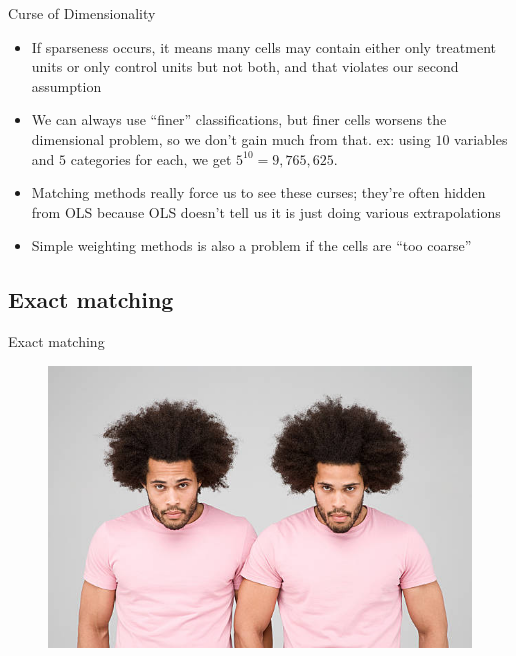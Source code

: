 \documentclass{beamer}
\begin{document}
\begin{frame}{Curse of Dimensionality}
	
	\begin{itemize}
	\item If sparseness occurs, it means many cells may contain either only treatment units or only control units but not both, and that violates our second assumption
	\item We can always use ``finer'' classifications, but finer cells worsens the dimensional problem, so we don't gain  much from that.  ex: using $10$ variables and $5$ categories for each, we get $5^{10} = 9,765,625$.  
	\item Matching methods really force us to see these curses; they're often hidden from OLS because OLS doesn't tell us it is just doing various extrapolations
	\item Simple weighting methods is also a problem if the cells are ``too coarse''
	\end{itemize}
\end{frame}	


\subsection{Exact matching}

\begin{frame}{Exact matching}

\begin{figure}[!t]\centering
\includegraphics[scale=1.1]{./lecture_includes/identical_twins}
\end{figure}

\end{frame}
\end{document}
